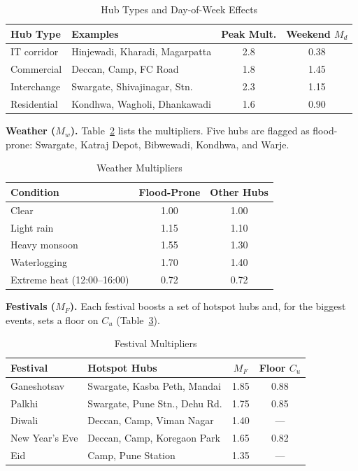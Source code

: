 \documentclass[conference]{IEEEtran}
\begin{document}
\begin{table}[h]
\caption{Hub Types and Day-of-Week Effects}
\label{tab:hubtypes}
\centering
\begin{tabular}{llcc}
\toprule
\textbf{Hub Type} & \textbf{Examples} & \textbf{Peak Mult.} & \textbf{Weekend $M_d$} \\
\midrule
IT corridor       & Hinjewadi, Kharadi, Magarpatta & 2.8 & 0.38 \\
Commercial        & Deccan, Camp, FC Road          & 1.8 & 1.45 \\
Interchange       & Swargate, Shivajinagar, Stn.   & 2.3 & 1.15 \\
Residential       & Kondhwa, Wagholi, Dhankawadi   & 1.6 & 0.90 \\
\bottomrule
\end{tabular}
\end{table}

\textbf{Weather ($M_w$).} Table~\ref{tab:weather} lists the multipliers. Five hubs are flagged as flood-prone: Swargate, Katraj Depot, Bibwewadi, Kondhwa, and Warje.

\begin{table}[h]
\caption{Weather Multipliers}
\label{tab:weather}
\centering
\begin{tabular}{lcc}
\toprule
\textbf{Condition} & \textbf{Flood-Prone} & \textbf{Other Hubs} \\
\midrule
Clear                        & 1.00 & 1.00 \\
Light rain                   & 1.15 & 1.10 \\
Heavy monsoon                & 1.55 & 1.30 \\
Waterlogging                 & 1.70 & 1.40 \\
Extreme heat (12:00--16:00)  & 0.72 & 0.72 \\
\bottomrule
\end{tabular}
\end{table}

\textbf{Festivals ($M_F$).} Each festival boosts a set of hotspot hubs and, for the biggest events, sets a floor on $C_u$ (Table~\ref{tab:festivals}).

\begin{table}[h]
\caption{Festival Multipliers}
\label{tab:festivals}
\centering
\begin{tabular}{llcc}
\toprule
\textbf{Festival} & \textbf{Hotspot Hubs} & $M_F$ & \textbf{Floor $C_u$} \\
\midrule
Ganeshotsav       & Swargate, Kasba Peth, Mandai    & 1.85 & 0.88 \\
Palkhi            & Swargate, Pune Stn., Dehu Rd.   & 1.75 & 0.85 \\
Diwali            & Deccan, Camp, Viman Nagar       & 1.40 & ---  \\
New Year's Eve    & Deccan, Camp, Koregaon Park     & 1.65 & 0.82 \\
Eid               & Camp, Pune Station              & 1.35 & ---  \\
\bottomrule
\end{tabular}
\end{table}
\end{document}
